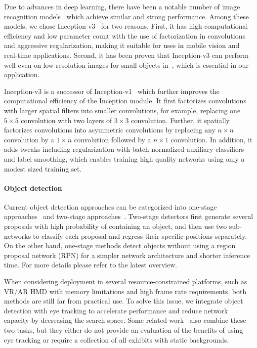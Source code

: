 Due to advances in deep learning, there have been a notable number of image
recognition models~\cite{simonyan2014very, szegedy2015going,
szegedy2016rethinking, he2016deep, szegedy2017inception} which achieve similar
and strong performance. Among these models, we chose
Inception-v3~\cite{szegedy2016rethinking} for two reasons. First, it has high
computational efficiency and low parameter count with the use of factorization
in convolutions and aggressive regularization, making it suitable for uses
in mobile vision and real-time applications. Second, it has been proven that
Inception-v3 can perform well even on low-resolution images for small objects
in~\cite{szegedy2016rethinking}, which is essential in our application.

Inception-v3 is a successor of Inception-v1~\cite{szegedy2015going} which
further improves the computational efficiency of the Inception module. It first
factorizes convolutions with larger spatial filters into smaller convolutions,
for example, replacing one $5 \times 5$ convolution with two layers of $3 \times
3$ convolution. Further, it spatially factorizes convolutions into asymmetric
convolutions by replacing any $n \times n$ convolution by a $1 \times n$
convolution followed by a $n \times 1$ convolution. In addition, it adds tweaks
including regularization with batch-normalized auxiliary classifiers and label
smoothing, which enables training high quality networks using only a modest
sized training set.

\paragraph{Object detection}

Current object detection approaches can be categorized into one-stage
approaches~\cite{redmon2016you, liu2016ssd, lin2017focal} and two-stage
approaches~\cite{girshick2014rich, girshick2015fast, ren2015faster, he2017mask}.
Two-stage detectors first generate several proposals with high probability of
containing an object, and then use two sub-networks to classify each
proposal and regress their specific positions separately. On the other hand,
one-stage methods detect objects without using a region proposal network (RPN)
for a simpler network architecture and shorter inference time. For more details
please refer to the latest overview\cite{liu2020deep}.

When considering deployment in several resource-constrained platforms, such as
VR/AR HMD with memory limitations and high frame rate requirements, both methods
are still far from practical use. To solve this issue, we integrate object
detection with eye tracking to accelerate performance and reduce network
capacity by decreasing the search space. Some related work~\cite{toyama2012gaze,
ishiguro2010aided, bonino2009blueprint} also combine these two tasks, but they
either do not provide an evaluation of the benefits of using eye tracking or
require a collection of all exhibits with static backgrounds.

